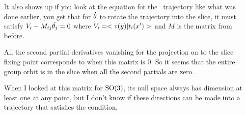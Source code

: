 \begin{description}
It also shows up if you look at the equation for the \reducedsp\ trajectory like what was done earlier, you get that for $\dot{{\bf \theta}}$ to rotate the trajectory into the slice, it must satisfy $V_i-M_{ij}\dot{{\bf \theta}_j}=0$ where $V_i=<v(y)|t_i(x')>$ and $M$ is the matrix from before.

All the second partial derivatives vanishing for the projection on to the slice fixing point corresponds to when this matrix is 0. So it seems that the entire group orbit is in the slice when all the second partials are zero.

When I looked at this matrix for $\textrm{SO}(3)$, its null space always has dimension at least one at any point, but I don't know if these directions can be made into a trajectory that satisfies the condition.
\end{description}
